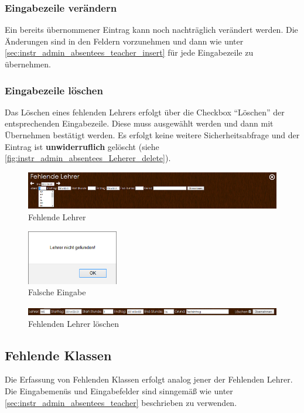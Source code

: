 \subsubsection{Eingabezeile verändern}
Ein bereits übernommener Eintrag kann noch nachträglich verändert werden. Die Änderungen sind in den Feldern vorzunehmen und dann wie unter \autoref{sec:instr_admin_absentees_teacher_insert} für jede Eingabezeile zu übernehmen.
\subsubsection{Eingabezeile löschen}
Das Löschen eines fehlenden Lehrers erfolgt über die Checkbox \enquote{Löschen} der entsprechenden Eingabezeile. Diese muss ausgewählt werden und dann mit Übernehmen bestätigt werden. Es erfolgt keine weitere Sicherheitsabfrage und der Eintrag ist \textbf{unwiderruflich} gelöscht (siehe \autoref{fig:instr_admin_absentees_Leherer_delete}).
\begin{figure}[H]
\centering
\includegraphics[keepaspectratio=true, width=14cm]{images/screenshots/absentees_teacher.png}
\caption{Fehlende Lehrer}
\label{fig:instr_admin_absentees_Lehrer}
\end{figure}
\begin{figure}[H]
\centering
\includegraphics[keepaspectratio=true, width=4cm]{images/screenshots/input_fail_teacher.png}
\caption{Falsche Eingabe}
\label{fig:instr_admin_absentees_fail}
\end{figure}
\begin{figure}[H]
\centering
\includegraphics[keepaspectratio=true, width=14cm]{images/screenshots/absentees_teacher_delete.png}
\caption{Fehlenden Lehrer löschen}
\label{fig:instr_admin_absentees_Leherer_delete}
\end{figure}
\subsection{Fehlende Klassen}
Die Erfassung von Fehlenden Klassen erfolgt analog jener der Fehlenden Lehrer. Die Eingabemenüs und Eingabefelder sind sinngemäß wie unter \autoref{sec:instr_admin_absentees_teacher} beschrieben zu verwenden.